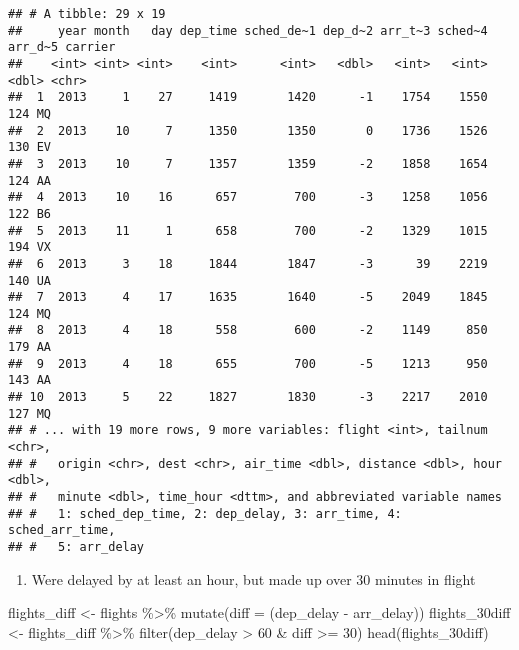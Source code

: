 \documentclass[
]{article}
\newenvironment{Shaded}{\begin{snugshade}}{\end{snugshade}}
\newcommand{\AttributeTok}[1]{\textcolor[rgb]{0.77,0.63,0.00}{#1}}
\newcommand{\DecValTok}[1]{\textcolor[rgb]{0.00,0.00,0.81}{#1}}
\newcommand{\FunctionTok}[1]{\textcolor[rgb]{0.00,0.00,0.00}{#1}}
\newcommand{\NormalTok}[1]{#1}
\newcommand{\OtherTok}[1]{\textcolor[rgb]{0.56,0.35,0.01}{#1}}
\newcommand{\SpecialCharTok}[1]{\textcolor[rgb]{0.00,0.00,0.00}{#1}}
\providecommand{\tightlist}{%
  \setlength{\itemsep}{0pt}\setlength{\parskip}{0pt}}
\begin{document}
\begin{verbatim}
## # A tibble: 29 x 19
##     year month   day dep_time sched_de~1 dep_d~2 arr_t~3 sched~4 arr_d~5 carrier
##    <int> <int> <int>    <int>      <int>   <dbl>   <int>   <int>   <dbl> <chr>  
##  1  2013     1    27     1419       1420      -1    1754    1550     124 MQ     
##  2  2013    10     7     1350       1350       0    1736    1526     130 EV     
##  3  2013    10     7     1357       1359      -2    1858    1654     124 AA     
##  4  2013    10    16      657        700      -3    1258    1056     122 B6     
##  5  2013    11     1      658        700      -2    1329    1015     194 VX     
##  6  2013     3    18     1844       1847      -3      39    2219     140 UA     
##  7  2013     4    17     1635       1640      -5    2049    1845     124 MQ     
##  8  2013     4    18      558        600      -2    1149     850     179 AA     
##  9  2013     4    18      655        700      -5    1213     950     143 AA     
## 10  2013     5    22     1827       1830      -3    2217    2010     127 MQ     
## # ... with 19 more rows, 9 more variables: flight <int>, tailnum <chr>,
## #   origin <chr>, dest <chr>, air_time <dbl>, distance <dbl>, hour <dbl>,
## #   minute <dbl>, time_hour <dttm>, and abbreviated variable names
## #   1: sched_dep_time, 2: dep_delay, 3: arr_time, 4: sched_arr_time,
## #   5: arr_delay
\end{verbatim}

\begin{enumerate}
\def\labelenumi{\alph{enumi})}
\setcounter{enumi}{5}
\tightlist
\item
  Were delayed by at least an hour, but made up over 30 minutes in
  flight
\end{enumerate}

\begin{Shaded}
\begin{Highlighting}[]
\NormalTok{flights\_diff }\OtherTok{\textless{}{-}}\NormalTok{ flights }\SpecialCharTok{\%\textgreater{}\%} \FunctionTok{mutate}\NormalTok{(}\AttributeTok{diff =}\NormalTok{ (dep\_delay }\SpecialCharTok{{-}}\NormalTok{ arr\_delay))}
\NormalTok{flights\_30diff }\OtherTok{\textless{}{-}}\NormalTok{ flights\_diff }\SpecialCharTok{\%\textgreater{}\%} \FunctionTok{filter}\NormalTok{(dep\_delay }\SpecialCharTok{\textgreater{}} \DecValTok{60} \SpecialCharTok{\&}\NormalTok{ diff }\SpecialCharTok{\textgreater{}=} \DecValTok{30}\NormalTok{)}
\FunctionTok{head}\NormalTok{(flights\_30diff)}
\end{Highlighting}
\end{Shaded}
\end{document}

